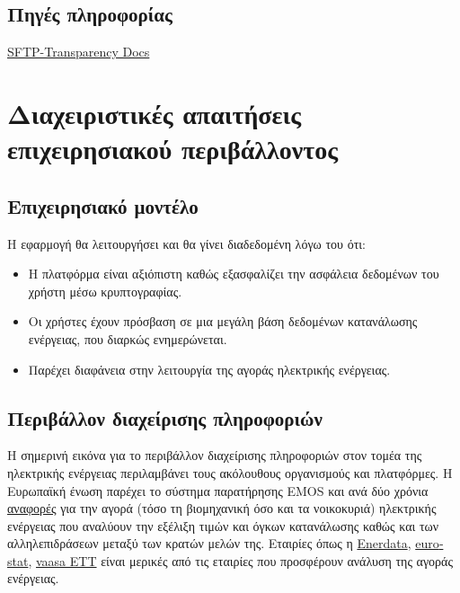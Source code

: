 \documentclass[a4paper,12pt, oneside]{article}
\begin{document}
\subsection*{Πηγές πληροφορίας}
\begingroup
\latintext
\sloppy
\begin{enumerate}
\begin{sloppypar}
   \item \href{https://transparency.entsoe.eu/content/static\_content/Static\%20content/knowledge\%20base/SFTP-Transparency\_Docs.html}{SFTP-Transparency Docs}
   \end{sloppypar}
\end{enumerate}
\endgroup
\greektext


\section{Διαχειριστικές απαιτήσεις επιχειρησιακού περιβάλλοντος} 
\subsection{Επιχειρησιακό μοντέλο}
Η εφαρμογή θα λειτουργήσει και θα γίνει διαδεδομένη λόγω του ότι:
\begin{itemize}
  \item Η πλατφόρμα είναι αξιόπιστη καθώς εξασφαλίζει την ασφάλεια δεδομένων του χρήστη μέσω κρυπτογραφίας.
  \item Οι χρήστες έχουν πρόσβαση σε μια μεγάλη βάση δεδομένων κατανάλωσης ενέργειας, που διαρκώς ενημερώνεται.
  \item Παρέχει διαφάνεια στην λειτουργία της αγοράς ηλεκτρικής ενέργειας.
\end{itemize}


\subsection{Περιβάλλον διαχείρισης πληροφοριών}
Η σημερινή εικόνα για το περιβάλλον διαχείρισης πληροφοριών  στον τομέα της ηλεκτρικής ενέργειας περιλαμβάνει τους ακόλουθους οργανισμούς και πλατφόρμες. Η Ευρωπαϊκή ένωση παρέχει το σύστημα παρατήρησης \textlatin{EMOS} και ανά δύο χρόνια \href{https://ec.europa.eu/energy/en/data-analysis/market-analysis#gas-and-electricity-market-reports}{αναφορές} για την αγορά (τόσο τη βιομηχανική όσο και τα νοικοκυριά) ηλεκτρικής ενέργειας  που αναλύουν την εξέλιξη τιμών και όγκων κατανάλωσης καθώς και των αλληλεπιδράσεων μεταξύ των κρατών μελών της. Εταιρίες όπως η \href{https://www.enerdata.net}{\textlatin{Enerdata}}, \href{https://ec.europa.eu/eurostat/web/energy}{\textlatin{eurostat}}, \href{http://www.vaasaett.com}{\textlatin{vaasa ETT}} είναι μερικές από τις εταιρίες που προσφέρουν ανάλυση της αγοράς ενέργειας. 
\newpage
\end{document}
